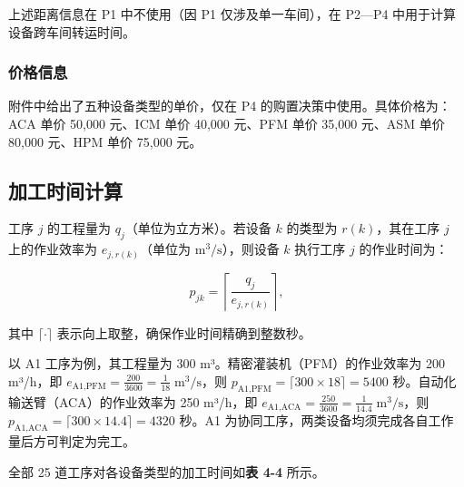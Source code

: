 \documentclass[UTF8,a4paper,12pt]{ctexart}
\begin{document}
上述距离信息在 P1 中不使用（因 P1 仅涉及单一车间），在 P2—P4 中用于计算设备跨车间转运时间。

\subsubsection{价格信息}
附件中给出了五种设备类型的单价，仅在 P4 的购置决策中使用。具体价格为：ACA 单价 50,000 元、ICM 单价 40,000 元、PFM 单价 35,000 元、ASM 单价 80,000 元、HPM 单价 75,000 元。

\subsection{加工时间计算}
工序 $j$ 的工程量为 $q_j$（单位为立方米）。若设备 $k$ 的类型为 $r(k)$，其在工序 $j$ 上的作业效率为 $e_{j,r(k)}$（单位为 $\text{m}^3/\text{s}$），则设备 $k$ 执行工序 $j$ 的作业时间为：

\begin{equation}
p_{jk} = \left\lceil \frac{q_j}{e_{j,r(k)}} \right\rceil,
\end{equation}

其中 $\lceil \cdot \rceil$ 表示向上取整，确保作业时间精确到整数秒。

以 A1 工序为例，其工程量为 300 m³。精密灌装机（PFM）的作业效率为 200 m³/h，即 $e_{\text{A1,PFM}} = \frac{200}{3600} = \frac{1}{18} \; \text{m}^3/\text{s}$，则 $p_{\text{A1,PFM}} = \lceil 300 \times 18 \rceil = 5400$ 秒。自动化输送臂（ACA）的作业效率为 250 m³/h，即 $e_{\text{A1,ACA}} = \frac{250}{3600} = \frac{1}{14.4} \; \text{m}^3/\text{s}$，则 $p_{\text{A1,ACA}} = \lceil 300 \times 14.4 \rceil = 4320$ 秒。A1 为协同工序，两类设备均须完成各自工作量后方可判定为完工。

全部 25 道工序对各设备类型的加工时间如\textbf{表 4-4} 所示。
\end{document}
